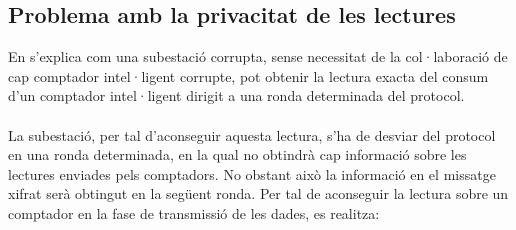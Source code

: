 \subsection{Problema amb la privacitat de les lectures}
En \cite{repair-busom} s'explica com una subestació corrupta, sense necessitat de la col·laboració de cap comptador intel·ligent corrupte, pot obtenir la lectura exacta del consum d'un comptador intel·ligent dirigit a una ronda determinada del protocol.
\\
\\
La subestació, per tal d'aconseguir aquesta lectura, s'ha de desviar del protocol en una ronda determinada, en la qual no obtindrà cap informació sobre les lectures enviades pels comptadors. No obstant això la informació en el missatge xifrat serà obtingut en la següent ronda. Per tal de aconseguir la lectura sobre un comptador en la fase de transmissió de les dades, es realitza:
